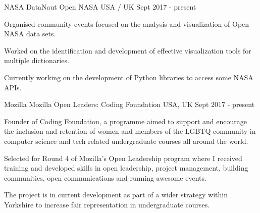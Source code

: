 


\begin{cventries}


\cventry
{NASA DataNaut} %
{Open NASA} %
{USA / UK} %
{Sept 2017 - present} %
{ %
\begin{cvitems}
\item {Organised community events focused on the analysis and visualization of Open NASA data sets.}
\item{Worked on the identification and development of effective visualization tools for multiple dictionaries.}
\item{Currently working on the development of Python libraries to access some NASA APIs.}
\end{cvitems}
}


\cventry
{Mozilla}
{Mozilla Open Leaders: Coding Foundation}
{USA, UK}
{Sept 2017 - present}
{
\begin{cvitems}
\item Founder of Coding Foundation, a programme aimed to support and encourage the inclusion and retention of women and members of the LGBTQ community in computer science and tech related undergraduate courses all around the world.
\item Selected for Round 4 of Mozilla’s Open Leadership program where I received training and developed skills in open leadership, project
management, building communities, open communications and running awesome events.
\item The project is in current development as part of a wider strategy within Yorkshire to increase fair representation in undergraduate courses.
\end{cvitems}
}


\end{cventries}